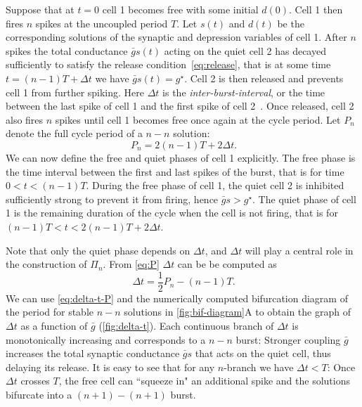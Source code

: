 \documentclass[utf8,draft]{frontiersFPHY} %
\newcommand{\gbar}{\bar g}
\newcommand{\delt}{\Delta t}
\begin{document}
Suppose that at $t=0$ cell 1 becomes free with some initial $d(0)$. 
Cell 1 then fires $n$ spikes at the uncoupled period $T$.
Let $s(t)$ and $d(t)$ be the corresponding solutions of the synaptic and depression variables of cell 1.
After $n$ spikes the total conductance $\gbar s(t)$ acting on the quiet cell 2 has decayed sufficiently to satisfy the release condition~\eqref{eq:release}, that is at some time $t=(n-1)T+\delt$ we have $\gbar s(t)=g^{\star}$.
Cell 2 is then released and prevents cell 1 from further spiking.
Here $\delt$ is the \emph{inter-burst-interval}, or the time between the last spike of cell 1 and the first spike of cell 2~\citep{bose2011}.
Once released, cell 2 also fires $n$ spikes until cell 1 becomes free once again at the cycle period.
Let $P_n$ denote the full cycle period of a $n-n$ solution:
\begin{equation}
 ~\label{eq:P}
  P_n = 2(n-1)T + 2\delt.
\end{equation}
We can now define the free and quiet phases of cell 1 explicitly. The free phase is the time interval between the first and last spikes of the burst, that is for time $0<t<(n-1)T$.
During the free phase of cell 1, the quiet cell 2 is inhibited sufficiently strong to prevent it from firing, hence $\gbar s > g^{\star}$.
The quiet phase of cell 1 is the remaining duration of the cycle when the cell is not firing, that is for $(n-1)T < t < 2(n-1)T + 2\delt$.

Note that only the quiet phase depends on $\delt$, and $\delt$ will play a central role in the construction of $\Pi_{n}$.
From \cref{eq:P} $\delt$ can be be computed as
\begin{equation}
 ~\label{eq:delta-t-P}
  \delt = \frac{1}{2}P_n - (n-1)T.
\end{equation}
\noindent
We can use \cref{eq:delta-t-P} and the numerically computed bifurcation diagram of the period for stable $n-n$ solutions in \cref{fig:bif-diagram}A to obtain the graph of $\delt$ as a function of $\gbar$ (\cref{fig:delta-t}).
Each continuous branch of $\delt$ is monotonically increasing and corresponds to a $n-n$ burst:
Stronger coupling $\gbar$ increases the total synaptic conductance $\gbar s$ that acts on the quiet cell, thus delaying its release.
It is easy to see that for any $n$-branch we have $\delt<T$:
Once $\delt$ crosses $T$, the free cell can ``squeeze in" an additional spike and the solutions bifurcate into a $(n+1)-(n+1)$ burst.
\end{document}

